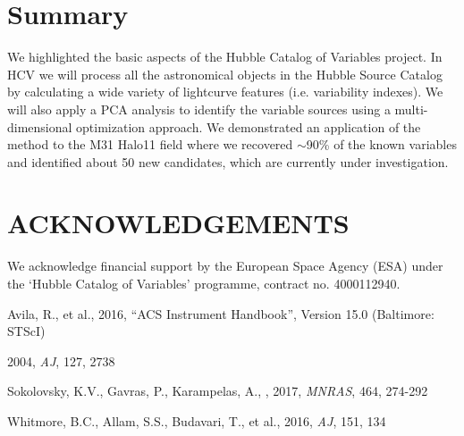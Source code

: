 \documentclass{iau}
\begin{document}
\section{Summary}
We highlighted the basic aspects of the Hubble Catalog of Variables project. In HCV we will process all the astronomical objects in the Hubble Source Catalog by calculating a wide variety of lightcurve features (i.e. variability indexes). We will also apply a PCA analysis to identify the variable sources using a multi-dimensional optimization approach. We demonstrated an application of the method to the M31 Halo11 field where we recovered $\sim$90\% of the known variables and identified about 50 new candidates, which are currently under investigation.
\section*{ACKNOWLEDGEMENTS}
We acknowledge financial support by the European Space Agency (ESA) under the ‘Hubble Catalog of Variables’ programme, contract no. 4000112940. 

\begin{thebibliography}{}

Avila, R., et al., 2016, “ACS Instrument Handbook”, Version 15.0 (Baltimore: STScI)

 2004,
\textit{AJ}, 127, 2738


{Sokolovsky, K.V., Gavras, P., Karampelas, A., \etal,} 2017,
\textit{MNRAS}, 464, 274-292

{Whitmore, B.C., Allam, S.S., Budavari, T., et al.,} 2016,
\textit{ AJ}, 151, 134

\end{thebibliography}
\end{document}
